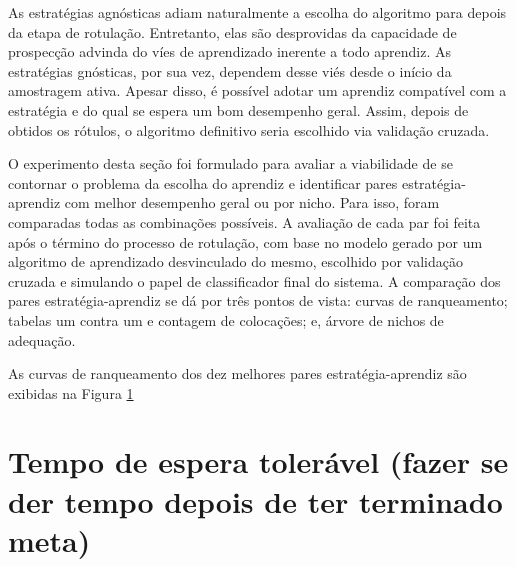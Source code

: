 As estratégias agnósticas adiam naturalmente a escolha do algoritmo para depois da
etapa de rotulação.
Entretanto, elas são desprovidas da capacidade de prospecção advinda do víes de
aprendizado inerente a todo aprendiz.
As estratégias gnósticas, por sua vez, dependem desse viés desde o início da amostragem ativa.
Apesar disso, é possível adotar um aprendiz compatível com a estratégia e do qual
se espera um bom desempenho geral.
Assim, depois de obtidos os rótulos, o algoritmo definitivo seria escolhido via validação cruzada.

O experimento desta seção foi formulado para avaliar a viabilidade de se contornar o
problema da escolha do aprendiz e identificar pares estratégia-aprendiz com melhor
desempenho geral ou por nicho.
Para isso, foram comparadas todas as combinações possíveis.
A avaliação de cada par foi feita após o término do processo de rotulação,
com base no modelo gerado por um algoritmo de aprendizado desvinculado do mesmo,
escolhido por validação cruzada e simulando o papel de classificador final do sistema.
A comparação dos pares estratégia-aprendiz se dá por três pontos de vista:
curvas de ranqueamento; tabelas um contra um e contagem de colocações; e,
árvore de nichos de adequação.

As curvas de ranqueamento dos dez melhores pares estratégia-aprendiz são exibidas
na Figura \ref{}




\section{Tempo de espera tolerável (fazer se der tempo depois de ter terminado meta)}



\citep{conf/amcis/Nah03}

% 
% 

